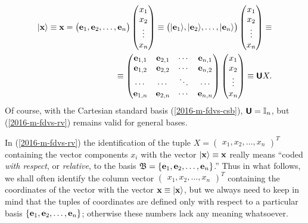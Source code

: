 \begin{equation}
\begin{split}
\vert {\bf x} \rangle \equiv {\bf x} =
\begin{pmatrix}{\bf e}_1,{\bf e}_2, \ldots , {\bf e}_n\end{pmatrix}
\begin{pmatrix} x_1\\x_2\\ \vdots \\ x_n \end{pmatrix}
\equiv
\begin{pmatrix} \vert {\bf e}_1\rangle ,\vert {\bf e}_2 \rangle ,  \ldots , \vert {\bf e}_n\rangle \end{pmatrix}
\begin{pmatrix} x_1\\x_2\\ \vdots \\ x_n \end{pmatrix} \equiv
\\
\equiv
\begin{pmatrix}
{\bf e}_{1,1} &   {\bf e}_{2,1}  &  \cdots &  {\bf e}_{n,1}\\
{\bf e}_{1,2} &   {\bf e}_{2,2}  &  \cdots &  {\bf e}_{n,2}\\
\cdots  & \cdots  &  \ddots &  \cdots \\
{\bf e}_{1,n} &   {\bf e}_{2,n}  &  \cdots &  {\bf e}_{n,n}\\
\end{pmatrix}
\begin{pmatrix} x_1\\x_2\\ \vdots \\ x_n \end{pmatrix}
\equiv
\textsf{\textbf{U}} X
 .
\label{2016-m-fdvs-rv}
\end{split}
\end{equation}
Of course, with the Cartesian standard basis (\ref{2016-m-fdvs-csb}), $\textsf{\textbf{U}} = {\Bbb I}_n$, but
(\ref{2016-m-fdvs-rv}) remains valid for general bases.


In (\ref{2016-m-fdvs-rv}) the identification of the tuple
$ X = \begin{pmatrix}
x_1, x_2, \ldots , x_n
\end{pmatrix}^T
$
containing the vector components $x_i$
with the vector $\vert {\bf x} \rangle \equiv {\bf x}$
really means
``coded {\em with respect}, or {\em relative},  to the basis ${\frak B}=\{{\bf e}_1,{\bf e}_2, \ldots , {\bf e}_n\}$.''
Thus in what follows, we shall often identify the column vector
$
\begin{pmatrix}
x_1, x_2, \ldots , x_n
\end{pmatrix}^T
$
containing the coordinates of the vector
with the vector ${\bf x}\equiv \vert {\bf x} \rangle$, but we always need to keep in mind that
the tuples of coordinates are defined only with respect to a particular basis
$\{ {\bf e}_1,{\bf e}_2, \ldots , {\bf e}_n \}$; otherwise these numbers lack any meaning whatsoever.

